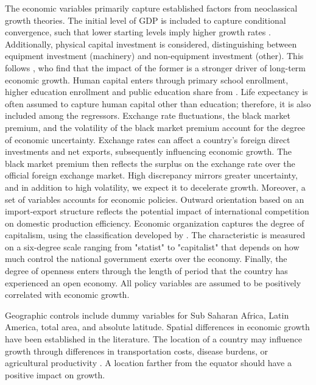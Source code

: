 \begin{refsection}
\begin{subappendices}
The economic variables primarily capture established factors from neoclassical growth theories. The initial level of GDP is included to capture conditional convergence, such that lower starting levels imply higher growth rates \parencite{BarroandMartin1992}. Additionally, physical capital investment is considered, distinguishing between equipment investment (machinery) and non-equipment investment (other). This follows \textcite{DeLongandSummers1991}, who find that the impact of the former is a stronger driver of long-term economic growth. Human capital enters through primary school enrollment, higher education enrollment and public education share from \textcite{Barro1996}. Life expectancy is often assumed to capture human capital other than education; therefore, it is also included among the regressors. Exchange rate fluctuations, the black market premium, and the volatility of the black market premium account for the degree of economic uncertainty. Exchange rates can affect a country's foreign direct investments and net exports, subsequently influencing economic growth. The black market premium then reflects the surplus on the exchange rate over the official foreign exchange market. High discrepancy mirrors greater uncertainty, and in addition to high volatility, we expect it to decelerate growth. Moreover, a set of variables accounts for economic policies. Outward orientation based on an import-export structure reflects the potential impact of international competition on domestic production efficiency. Economic organization captures the degree of capitalism, using the classification developed by \textcite{HallJones1996}. The characteristic is measured on a six-degree scale ranging from "statist" to "capitalist" that depends on how much control the national government exerts over the economy. Finally, the degree of openness enters through the length of period that the country has experienced an open economy. All policy variables are assumed to be positively correlated with economic growth.

Geographic controls include dummy variables for Sub Saharan Africa, Latin America, total area, and absolute latitude. Spatial differences in economic growth have been established in the literature. The location of a country may influence growth through differences in transportation costs, disease burdens, or agricultural productivity \parencite{Gallupandsachs1999}. A location farther from the equator should have a positive impact on growth.


\end{subappendices}
\end{refsection}
